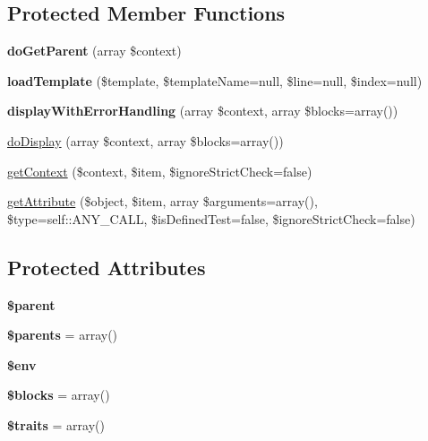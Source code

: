 \subsection*{Protected Member Functions}
\begin{DoxyCompactItemize}
\item 
{\bfseries do\+Get\+Parent} (array \$context)\hypertarget{classTwig__Template_afcc644fbd195298403a3dec529d5e7da}{}\label{classTwig__Template_afcc644fbd195298403a3dec529d5e7da}

\item 
{\bfseries load\+Template} (\$template, \$template\+Name=null, \$line=null, \$index=null)\hypertarget{classTwig__Template_ad3e56b78dd24a703ec368a793bdfeab7}{}\label{classTwig__Template_ad3e56b78dd24a703ec368a793bdfeab7}

\item 
{\bfseries display\+With\+Error\+Handling} (array \$context, array \$blocks=array())\hypertarget{classTwig__Template_a3d15f372a47bfce0f91012120fef19e5}{}\label{classTwig__Template_a3d15f372a47bfce0f91012120fef19e5}

\item 
\hyperlink{classTwig__Template_a601cdef751ff56ca0cf8122deef9e087}{do\+Display} (array \$context, array \$blocks=array())
\item 
\hyperlink{classTwig__Template_a841ce1e54590c6c5f606052e2b9ca8b0}{get\+Context} (\$context, \$item, \$ignore\+Strict\+Check=false)
\item 
\hyperlink{classTwig__Template_af8407d48ea17fca32efb531b7c571dac}{get\+Attribute} (\$object, \$item, array \$arguments=array(), \$type=self\+::\+A\+N\+Y\+\_\+\+C\+A\+LL, \$is\+Defined\+Test=false, \$ignore\+Strict\+Check=false)
\end{DoxyCompactItemize}
\subsection*{Protected Attributes}
\begin{DoxyCompactItemize}
\item 
{\bfseries \$parent}\hypertarget{classTwig__Template_a94390fb8343458c84328d9b5589b1e03}{}\label{classTwig__Template_a94390fb8343458c84328d9b5589b1e03}

\item 
{\bfseries \$parents} = array()\hypertarget{classTwig__Template_ac92cf822da34975ad9e74340cca4acf5}{}\label{classTwig__Template_ac92cf822da34975ad9e74340cca4acf5}

\item 
{\bfseries \$env}\hypertarget{classTwig__Template_a0fb5596b383bb87c0dc25307ca243923}{}\label{classTwig__Template_a0fb5596b383bb87c0dc25307ca243923}

\item 
{\bfseries \$blocks} = array()\hypertarget{classTwig__Template_af4045dfed9daaf2d9b317a7d724de6bc}{}\label{classTwig__Template_af4045dfed9daaf2d9b317a7d724de6bc}

\item 
{\bfseries \$traits} = array()\hypertarget{classTwig__Template_a4b6864ac3db6da2c8102a81dc12a3591}{}\label{classTwig__Template_a4b6864ac3db6da2c8102a81dc12a3591}

\end{DoxyCompactItemize}
